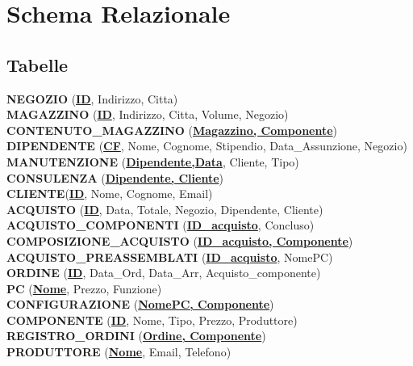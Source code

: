 \section{Schema Relazionale}

\subsection{Tabelle}
\textbf{NEGOZIO} (\textbf{\underline{ID}}, Indirizzo, Citta)\\
\textbf{MAGAZZINO} (\textbf{\underline{ID}}, Indirizzo, Citta, Volume, Negozio)\\
\textbf{CONTENUTO\_MAGAZZINO} (\textbf{\underline{Magazzino, Componente}})\\
\textbf{DIPENDENTE} (\textbf{\underline{CF}}, Nome, Cognome, Stipendio, Data\_Assunzione, Negozio)\\
\textbf{MANUTENZIONE} (\textbf{\underline{Dipendente,Data}}, Cliente, Tipo)\\
\textbf{CONSULENZA} (\textbf{\underline{Dipendente, Cliente}})\\
\textbf{CLIENTE}(\textbf{\underline{ID}}, Nome, Cognome, Email)\\
\textbf{ACQUISTO} (\textbf{\underline{ID}}, Data, Totale, Negozio, Dipendente, Cliente)\\
\textbf{ACQUISTO\_COMPONENTI} (\textbf{\underline{ID\_acquisto}}, Concluso)\\
\textbf{COMPOSIZIONE\_ACQUISTO} (\textbf{\underline{ID\_acquisto, Componente}})\\
\textbf{ACQUISTO\_PREASSEMBLATI} (\textbf{\underline{ID\_acquisto}}, NomePC)\\
\textbf{ORDINE} (\textbf{\underline{ID}}, Data\_Ord, Data\_Arr, Acquisto\_componente)\\
\textbf{PC} (\textbf{\underline{Nome}}, Prezzo, Funzione)\\
\textbf{CONFIGURAZIONE} (\textbf{\underline{NomePC, Componente}})\\
\textbf{COMPONENTE} (\textbf{\underline{ID}}, Nome, Tipo, Prezzo, Produttore)\\
\textbf{REGISTRO\_ORDINI} (\textbf{\underline{Ordine, Componente}})\\
\textbf{PRODUTTORE} (\textbf{\underline{Nome}}, Email, Telefono)\\

